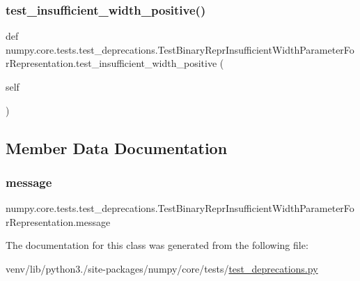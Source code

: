 \subsubsection{\texorpdfstring{test\+\_\+insufficient\+\_\+width\+\_\+positive()}{test\_insufficient\_width\_positive()}}
{\footnotesize\ttfamily def numpy.\+core.\+tests.\+test\+\_\+deprecations.\+Test\+Binary\+Repr\+Insufficient\+Width\+Parameter\+For\+Representation.\+test\+\_\+insufficient\+\_\+width\+\_\+positive (\begin{DoxyParamCaption}\item[{}]{self }\end{DoxyParamCaption})}



\subsection{Member Data Documentation}
\mbox{\label{classnumpy_1_1core_1_1tests_1_1test__deprecations_1_1TestBinaryReprInsufficientWidthParameterForRepresentation_a96a88a754f0db600c941a987f9ae0488}} 
\subsubsection{\texorpdfstring{message}{message}}
{\footnotesize\ttfamily numpy.\+core.\+tests.\+test\+\_\+deprecations.\+Test\+Binary\+Repr\+Insufficient\+Width\+Parameter\+For\+Representation.\+message}



The documentation for this class was generated from the following file\+:\begin{DoxyCompactItemize}
\item 
venv/lib/python3./site-\/packages/numpy/core/tests/\hyperlink{core_2tests_2test__deprecations_8py}{test\+\_\+deprecations.\+py}\end{DoxyCompactItemize}
